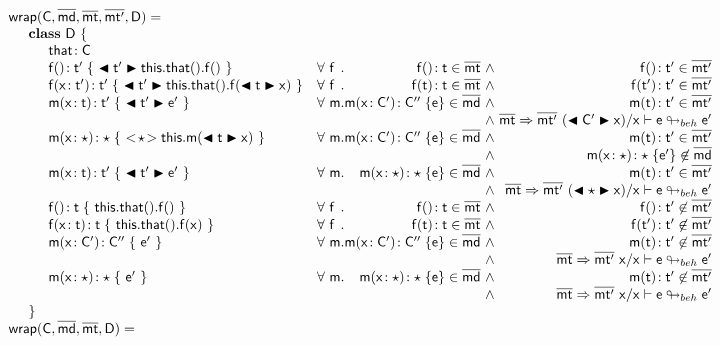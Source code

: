 \documentclass[a4paper,USenglish]{tex/lipics-v2016}
\begin{document}
\begin{figure}[!ht]
\hrulefill 
\footnotesize

\vspace{4mm}
\[\begin{array}{@{}ll@{}l@{}r@{~}c@{~}r}
    \wrap\C{\b\md}\bmt\bmtp\D = \\
\SP \class ~\D ~ \{\\
\SPP \Fdef\that\C \\
\SPP \Mdefz\f{\tp}{~\BehCast\tp{\Get{\Get\this\that}\f}~}
&    \All \f \Mtype\f{}\t\in\bmt &\wedge& \Mtype\f{}\tp \in \bmtp
\\
\SPP \Mdef\f\x\tp\tp {~\BehCast\tp{\Set{\Get\this\that}\f{\BehCast\t\x}}~}
&    \All \f \Mtype\f\t\t \in \bmt &\wedge& \Mtype\f\tp\tp \in \bmtp
\\
\SPP \Mdef\m\x\t\tp {~\BehCast\tp{{\ep}}~}
&     \All \m \Mdef\m\x\Cp\Cpp\e\in\b\md &\wedge& \Mtype\m\t\tp\in\bmtp \\
&&&&\wedge&\rtranst{\bmt}\bmtp{(\BehCast\Cp\x)}\x{\e}{\ep}
\\
\SPP \Mdef\m\x\any\any {~\SubCast\any{\Call\this\m{\BehCast{\t}\x}}~}
&     \All \m \Mdef\m\x\Cp\Cpp\e\in\b\md &\wedge& \Mtype\m\t\tp\in\bmtp\\
&&&&\wedge&\Mdef\m\x\any\any{\e'}\not\in\b\md
\\
\SPP \Mdef\m\x\t\tp{~\BehCast\tp{\ep}~}
&     \All \m \Mdef\m\x\any\any\e\in\b\md &\wedge& \Mtype\m\t\tp\in\bmtp \\
&&&&\wedge&\rtranst{\bmt}\bmtp{(\BehCast\any\x)}\x\e{\ep}
\\
\SPP \Mdefz\f\t { ~\Get{\Get\this\that}\f~}
&    \All \f \Mtype\f{}\t \in \bmt &\wedge& \Mtype\f{}\tp \not\in \bmtp
\\
\SPP \Mdef\f\x\t\t { ~\Set{\Get\this\that}\f\x~}
&    \All \f \Mtype\f\t\t \in \bmt&\wedge& \Mtype\f\tp\tp \not\in \bmtp
\\
\SPP \Mdef\m\x{\Cp}{\Cpp} {~\ep~}
&    \All \m  \Mdef\m\x\Cp\Cpp\e\in\b\md &\wedge& \Mtype\m\t\tp\not\in \bmtp \\
&&&&\wedge&\rtranst{\bmt}\bmtp\x\x{\e}{\ep}
\\
\SPP \Mdef\m\x\any\any {~\ep~}
&    \All \m  \Mdef\m\x\any\any\e\in\b\md  &\wedge& \Mtype\m\t\tp\not\in\bmtp \\
&&&&\wedge&\rtranst{\bmt}\bmtp\x\x{\e}{\ep}
\\
\SP \}
\\
\wrapAny\C\bmd\bmt\D = \\

\end{array}\]
\end{figure}
\end{document}
